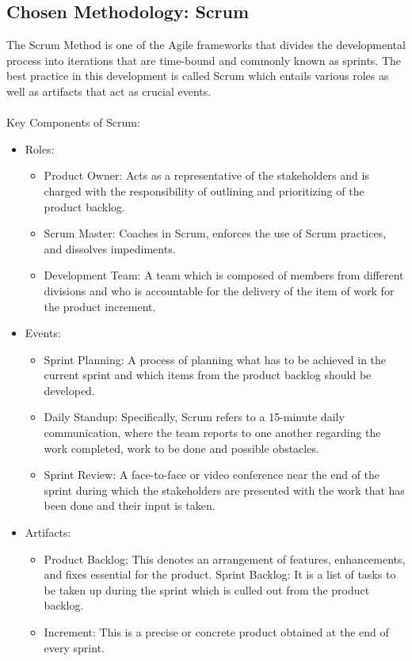 \subsection{Chosen Methodology: Scrum}
The Scrum Method is one of the Agile frameworks that divides the developmental process into iterations that are time-bound and commonly known as sprints. The best practice in this development is called Scrum which entails various roles as well as artifacts that act as crucial events. \\ \\
Key Components of Scrum: 
\begin{itemize}
    \item Roles:
    \begin{itemize}
    \item Product Owner: Acts as a representative of the stakeholders and is charged with the responsibility of outlining and prioritizing of the product backlog.
    \item Scrum Master: Coaches in Scrum, enforces the use of Scrum practices, and dissolves impediments.
    \item Development Team: A team which is composed of members from different divisions and who is accountable for the delivery of the item of work for the product increment.
\end{itemize}
    \item Events:
    \begin{itemize}
    \item Sprint Planning: A process of planning what has to be achieved in the current sprint and which items from the product backlog should be developed.
    \item Daily Standup: Specifically, Scrum refers to a 15-minute daily communication, where the team reports to one another regarding the work completed, work to be done and possible obstacles.
    \item Sprint Review: A face-to-face or video conference near the end of the sprint during which the stakeholders are presented with the work that has been done and their input is taken.
\end{itemize}   
\item Artifacts:
\begin{itemize}
    \item Product Backlog: This denotes an arrangement of features, enhancements, and fixes essential for the product. Sprint Backlog: It is a list of tasks to be taken up during the sprint which is culled out from the product backlog.
    \item Increment: This is a precise or concrete product obtained at the end of every sprint.
\end{itemize}
\end{itemize}

